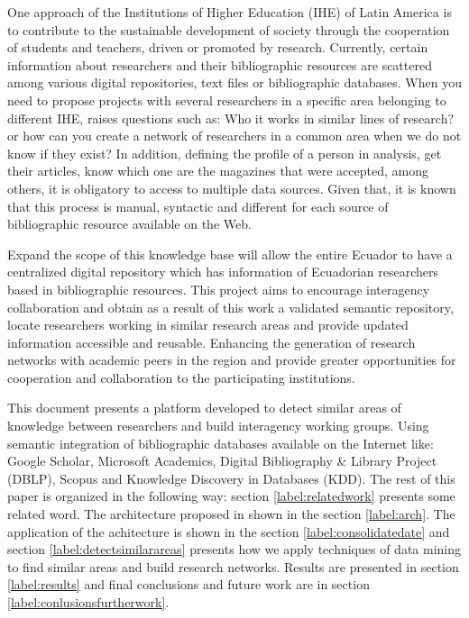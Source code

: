 \documentclass[11pt]{article}
\begin{document}
One approach of the Institutions of Higher Education (IHE) of Latin America is to contribute to the sustainable development of society through the cooperation of students and teachers, driven or promoted  by research. Currently, certain information about researchers and their bibliographic resources are scattered among various digital repositories, text files or bibliographic databases. When you need to propose projects with several researchers in a specific area belonging to different IHE, raises questions such as: Who it works in similar lines of research? or how can you create a network of researchers in a common area when we do not know if they exist? In addition, defining the profile of a person in analysis, get their articles, know which one are the magazines that were accepted, among others, it is obligatory to access to multiple data sources. Given that, it is known that this process is manual, syntactic and different for each source of bibliographic resource available on the Web.

Expand the scope of this knowledge base will allow the entire Ecuador to have a centralized digital repository which has information of Ecuadorian researchers based in bibliographic resources. This project aims to encourage interagency collaboration and obtain as a result of this work a validated semantic repository, locate researchers working in similar research areas and provide updated information accessible and reusable. Enhancing the generation of research networks with academic peers in the region and provide greater opportunities for cooperation and collaboration to the participating institutions.

This document presents a platform developed to detect similar areas of knowledge between  researchers and build interagency working groups. Using semantic integration of bibliographic databases available on the Internet like: Google Scholar, Microsoft Academics, Digital Bibliography \& Library Project (DBLP), Scopus and Knowledge Discovery in Databases (KDD). The rest of this paper is organized in the following way: section \ref{label:relatedwork} presents some related word. The architecture proposed in shown in the section \ref{label:arch}. The application of the achitecture is shown in the section \ref{label:consolidatedate} and section \ref{label:detectsimilarareas} presents how we apply techniques of data mining  to find similar areas and build research networks. Results are presented in section \ref{label:results} and final conclusions and future work are in section \ref{label:conlusionsfurtherwork}.
\end{document}
